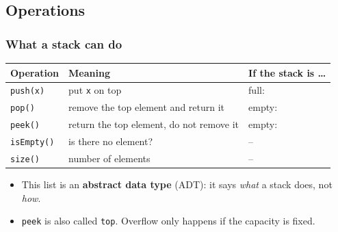 \documentclass[aspectratio=169,10pt,compress]{beamer}
\begin{document}

\subsection[Operations]{Operations}




\begin{frame}[t,fragile] \frametitle{What a stack can do}
  \begin{center}\small
  \begin{tabular}{lL{0.42\textwidth}L{0.3\textwidth}}
    \toprule
    \textbf{Operation}          & \textbf{Meaning}                                 & \textbf{If the stack is \dots} \\
    \midrule
    \texttt{push(x)}            & put \texttt{x} on top                            & full:  \\
    \texttt{pop()}              & remove the top element and return it             & empty:  \\
    \texttt{peek()}             & return the top element, do not remove it         & empty:  \\
    \texttt{isEmpty()}          & is there no element?                             & -- \\
    \texttt{size()}             & number of elements                               & -- \\
    \bottomrule
  \end{tabular}
  \end{center}
  \vspace{0.5em}
  \begin{itemize}\small
    \item This list is an \textbf{abstract data type} (ADT): it says \emph{what} a stack does, not \emph{how}.
    \item \texttt{peek} is also called \texttt{top}. Overflow only happens if the capacity is fixed.
  \end{itemize}
\end{frame}
\end{document}

